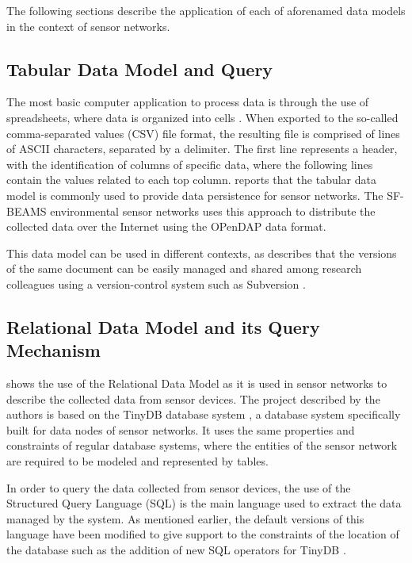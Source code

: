 The following sections describe the application of each of aforenamed data
models in the context of sensor networks.

\subsection{Tabular Data Model and Query}

The most basic computer application to process data is through the use of
spreadsheets, where data is organized into cells \cite{tabular-model}. When
exported to the so-called comma-separated values (CSV) file format, the
resulting file is comprised of lines of ASCII characters, separated by a
delimiter. The first line represents a header, with the identification of
columns of specific data, where the following lines contain the values
related to each top column. \cite{sn-provenance} reports that the tabular
data model is commonly used to provide data persistence for sensor networks.
The SF-BEAMS environmental sensor networks \cite{sfbeams2006} uses this
approach to distribute the collected data over the Internet using the OPenDAP
\cite{opendap} data format.

This data model can be used in different contexts, as \cite{sn-provenance}
describes that the versions of the same document can be easily managed and
shared among research colleagues using a version-control system such as
Subversion \cite{subversion}.

\subsection{Relational Data Model and its Query Mechanism}

\cite{sn-db-newop} shows the use of the Relational Data Model
\cite{relational-model} as it is used in sensor networks to describe the
collected data from sensor devices. The project described
by the authors is based on the TinyDB database system \cite{sn-db-tinydb}, a
database system specifically built for data nodes of sensor networks. It uses
the same properties and constraints of regular database systems, where the
entities of the sensor network are required to be modeled and represented by
tables.

In order to query the data collected from sensor devices, the use of the 
Structured Query Language (SQL) \cite{sql} is the main language used to extract
the data managed by the system. As mentioned earlier, the default versions of
this language have been modified to give support to the constraints of the
location of the database such as the addition of new SQL operators for TinyDB
\cite{sn-db-newop}.

